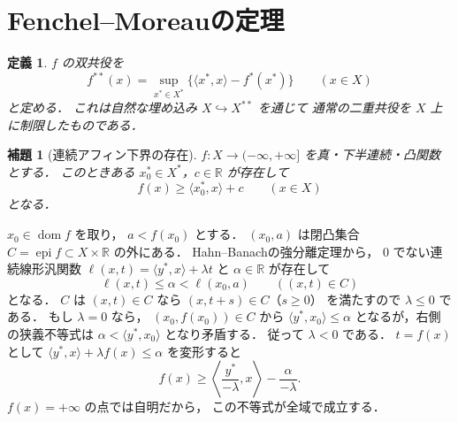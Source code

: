 \documentclass[a5paper,10pt,onecolumn]{jsarticle}
\makeatletter
\theoremstyle{mathnotetheorem}
\newtheorem{definition}[theorem]{定義}
\newtheorem{lemma}[theorem]{補題}
\renewcommand{\proofname}{証明}
\renewenvironment{proof}[1][\proofname]{%
  \par\pushQED{\qed}\normalfont\topsep4\p@\@plus2\p@\relax
  \trivlist\item[\hskip\labelsep\bfseries #1]\ignorespaces
}{\popQED\endtrivlist\@endpefalse}
\makeatother
\begin{document}
\section{Fenchel--Moreauの定理}

\begin{definition}
$f$ の\emph{双共役}を
\[
 f^{**}(x)=
 \sup_{x^*\in X^*}
 \{\langle x^*,x\rangle-f^*(x^*)\}
 \qquad(x\in X)
\]
と定める．
これは自然な埋め込み $X\hookrightarrow X^{**}$ を通じて
通常の二重共役を $X$ 上に制限したものである．
\end{definition}

\begin{lemma}[連続アフィン下界の存在]\label{lem:affine-minorant}
$f:X\to(-\infty,+\infty]$ を真・下半連続・凸関数とする．
このときある $x_0^*\in X^*$，$c\in\mathbb R$ が存在して
\[
 f(x)\ge\langle x_0^*,x\rangle+c
 \qquad(x\in X)
\]
となる．
\end{lemma}
\begin{proof}
$x_0\in\operatorname{dom}f$ を取り，
$a<f(x_0)$ とする．
$(x_0,a)$ は閉凸集合
$C=\operatorname{epi}f\subset X\times\mathbb R$ の外にある．
Hahn--Banachの強分離定理から，
$0$ でない連続線形汎関数
$\ell(x,t)=\langle y^*,x\rangle+\lambda t$ と
$\alpha\in\mathbb R$ が存在して
\[
 \ell(x,t)\le\alpha<\ell(x_0,a)
 \qquad((x,t)\in C)
\]
となる．
$C$ は $(x,t)\in C$ なら $(x,t+s)\in C$（$s\ge0$）
を満たすので $\lambda\le0$ である．
もし $\lambda=0$ なら，
$(x_0,f(x_0))\in C$ から
$\langle y^*,x_0\rangle\le\alpha$
となるが，右側の狭義不等式は
$\alpha<\langle y^*,x_0\rangle$ となり矛盾する．
従って $\lambda<0$ である．
$t=f(x)$ として
$\langle y^*,x\rangle+\lambda f(x)\le\alpha$
を変形すると
\[
 f(x)\ge\left\langle\frac{y^*}{-\lambda},x\right\rangle
             -\frac{\alpha}{-\lambda}.
\]
$f(x)=+\infty$ の点では自明だから，
この不等式が全域で成立する．
\end{proof}
\end{document}
